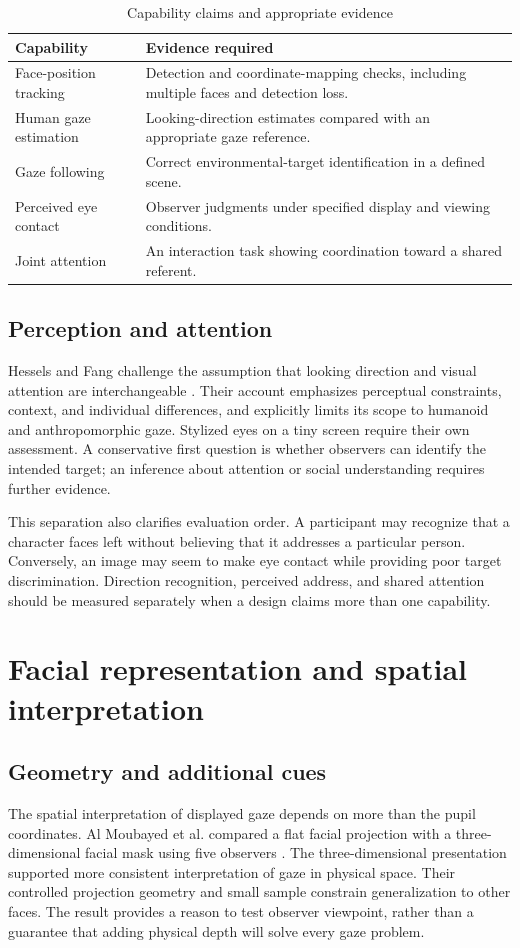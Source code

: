 \documentclass[journal]{IEEEtran}
\begin{document}
\begin{table}[t]
\caption{Capability claims and appropriate evidence}
\label{tab:claims}
\centering
\footnotesize
\begin{tabularx}{\columnwidth}{@{}p{}Y@{}}
\toprule
Capability & Evidence required \\
\midrule
Face-position tracking & Detection and coordinate-mapping checks, including multiple faces and detection loss. \\
Human gaze estimation & Looking-direction estimates compared with an appropriate gaze reference. \\
Gaze following & Correct environmental-target identification in a defined scene. \\
Perceived eye contact & Observer judgments under specified display and viewing conditions. \\
Joint attention & An interaction task showing coordination toward a shared referent. \\
\bottomrule
\end{tabularx}
\end{table}

\subsection{Perception and attention}
Hessels and Fang challenge the assumption that looking direction and visual attention are interchangeable \cite{hessels2026}. Their account emphasizes perceptual constraints, context, and individual differences, and explicitly limits its scope to humanoid and anthropomorphic gaze. Stylized eyes on a tiny screen require their own assessment. A conservative first question is whether observers can identify the intended target; an inference about attention or social understanding requires further evidence.

This separation also clarifies evaluation order. A participant may recognize that a character faces left without believing that it addresses a particular person. Conversely, an image may seem to make eye contact while providing poor target discrimination. Direction recognition, perceived address, and shared attention should be measured separately when a design claims more than one capability.

\section{Facial representation and spatial interpretation}
\subsection{Geometry and additional cues}
The spatial interpretation of displayed gaze depends on more than the pupil coordinates. Al Moubayed et al. compared a flat facial projection with a three-dimensional facial mask using five observers \cite{almoubayed2012}. The three-dimensional presentation supported more consistent interpretation of gaze in physical space. Their controlled projection geometry and small sample constrain generalization to other faces. The result provides a reason to test observer viewpoint, rather than a guarantee that adding physical depth will solve every gaze problem.
\end{document}
